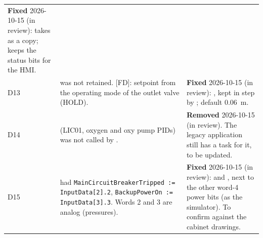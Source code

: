 \documentclass[11pt]{article}
\newcommand{\code}[1]{\texttt{#1}}
\begin{document}
\begin{longtable}{@{}lP{66mm}P{80mm}@{}}
  \textbf{Fixed} 2026-10-15 (in review):  takes  as a 
  copy;  keeps the status bits for the HMI. \\
D13 &  was not retained. [FD]: setpoint from the operating mode of
  the outlet valve (HOLD). & \textbf{Fixed} 2026-10-15 (in review): ,
  kept in step by ; default 0.06~m. \\
D14 &  (LIC01, oxygen and oxy pump PIDs) was not called by . &
  \textbf{Removed} 2026-10-15 (in review). The legacy application  still has a
   task for it, to be updated. \\
D15 &  had \code{MainCircuitBreakerTripped := InputData[2].2},
  \code{BackupPowerOn := InputData[3].3}. Words 2 and 3 are analog (pressures). &
  \textbf{Fixed} 2026-10-15 (in review):  and , next to the
  other word-4 power bits (as the simulator). To confirm against the cabinet drawings. \\
\end{longtable}
\end{document}

